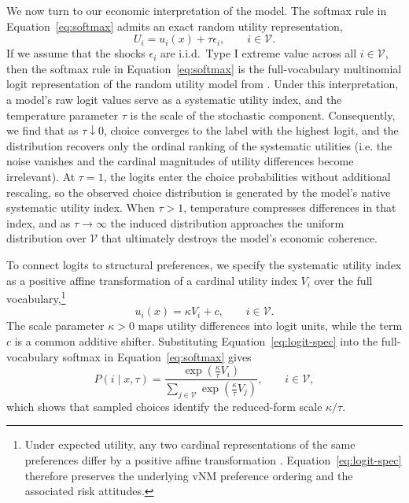 We now turn to our economic interpretation of the model. The softmax rule in Equation~\eqref{eq:softmax} admits an exact random utility representation,
\begin{equation}\label{eq:rum}
  U_i = u_i(x) + \tau \epsilon_i, \qquad i \in \mathcal{V}.
\end{equation}
If we assume that the shocks $\epsilon_i$ are i.i.d.\ Type I extreme value across all $i \in \mathcal{V}$, then the softmax rule in Equation~\eqref{eq:softmax} is the full-vocabulary multinomial logit representation of the random utility model from \citep{mcfadden1972conditional}. Under this interpretation, a model's raw logit values serve as a systematic utility index, and the temperature parameter $\tau$ is the scale of the stochastic component. Consequently, we find that as $\tau \downarrow 0$, choice converges to the label with the highest logit, and the distribution recovers only the ordinal ranking of the systematic utilities (i.e. the noise vanishes and the cardinal magnitudes of utility differences become irrelevant). At $\tau = 1$, the logits enter the choice probabilities without additional rescaling, so the observed choice distribution is generated by the model's native systematic utility index. When $\tau > 1$, temperature compresses differences in that index, and as $\tau \rightarrow \infty$ the induced distribution approaches the uniform distribution over $\mathcal{V}$ that ultimately destroys the model's economic coherence.

To connect logits to structural preferences, we specify the systematic utility index as a positive affine transformation of a cardinal utility index $V_i$ over the full vocabulary,\footnote{Under expected utility, any two cardinal representations of the same preferences differ by a positive affine transformation \citep{von1947theory}. Equation~\eqref{eq:logit-spec} therefore preserves the underlying vNM preference ordering and the associated risk attitudes.}
\begin{equation}\label{eq:logit-spec}
  u_i(x) = \kappa V_i + c, \qquad i \in \mathcal{V}.
\end{equation}
The scale parameter $\kappa > 0$ maps utility differences into logit units, while the term $c$ is a common additive shifter. Substituting Equation~\eqref{eq:logit-spec} into the full-vocabulary softmax in Equation~\eqref{eq:softmax} gives
\begin{equation}\label{eq:choice-prob}
  P(i \mid x, \tau) = \frac{\exp(\frac{\kappa}{\tau} V_i)}{\sum_{j \in \mathcal{V}} \exp(\frac{\kappa}{\tau} V_j)},\qquad i \in \mathcal{V},
\end{equation}
which shows that sampled choices identify the reduced-form scale $\kappa / \tau$.

